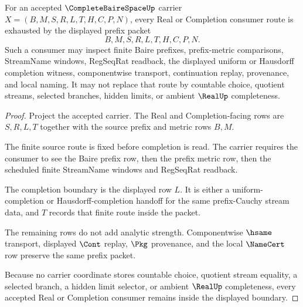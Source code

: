 \begin{theorem}
\label{thm:complete-baire-space-real-completion-boundary}
For an accepted $\CompleteBaireSpaceUp$ carrier $X=(B,M,S,R,L,T,H,C,P,N)$, every Real or Completion consumer route is exhausted by the displayed prefix packet
$$
B,M,S,R,L,T,H,C,P,N .
$$
Such a consumer may inspect finite Baire prefixes, prefix-metric comparisons, StreamName windows, RegSeqRat readback, the displayed uniform or Hausdorff completion witness, componentwise transport, continuation replay, provenance, and local naming. It may not replace that route by countable choice, quotient streams, selected branches, hidden limits, or ambient $\RealUp$ completeness.
\end{theorem}
\begin{proof}
Project the accepted carrier. The Real and Completion-facing rows are $S,R,L,T$ together with the source prefix and metric rows $B,M$.

The finite source route is fixed before completion is read. The carrier requires the consumer to see the Baire prefix row, then the prefix metric row, then the scheduled finite StreamName windows and RegSeqRat readback.

The completion boundary is the displayed row $L$. It is either a uniform-completion or Hausdorff-completion handoff for the same prefix-Cauchy stream data, and $T$ records that finite route inside the packet.

The remaining rows do not add analytic strength. Componentwise $\hsame$ transport, displayed $\Cont$ replay, $\Pkg$ provenance, and the local $\NameCert$ row preserve the same prefix packet.

Because no carrier coordinate stores countable choice, quotient stream equality, a selected branch, a hidden limit selector, or ambient $\RealUp$ completeness, every accepted Real or Completion consumer remains inside the displayed boundary.
\end{proof}



